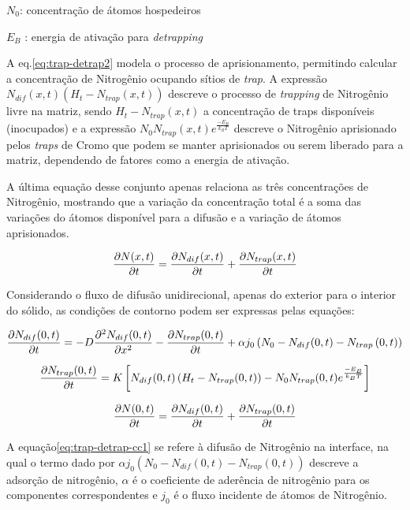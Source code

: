 $N_0$: concentração de átomos hospedeiros
	
$E_B$ : energia de ativação para \textit{detrapping}

A eq.\autoref{eq:trap-detrap2} modela o processo de aprisionamento, permitindo calcular a concentração de Nitrogênio ocupando sítios de \textit{trap}. A expressão $N_{dif}(x,t)\left(H_t-N_{trap}(x,t)\right)$ descreve o processo de \textit{trapping} de Nitrogênio livre na matriz, sendo $H_t - N_{trap}(x,t)$ a concentração de traps disponíveis (inocupados) e a expressão $ N_0 N_{trap}(x,t)e^{\frac{-E_B}{k_BT}}$ descreve o Nitrogênio aprisionado pelos \textit{traps} de Cromo que podem se manter aprisionados ou serem liberado para a matriz, dependendo de fatores como a energia de ativação.

A última equação desse conjunto apenas relaciona as três concentrações de Nitrogênio, mostrando que a variação da concentração total é a soma das variações do átomos disponível para a difusão e a variação de átomos aprisionados. 

\begin{equation}
\label{eq:trap-detrap3}
\pdv{N(x,t)}{t} = \pdv{N_{dif}(x,t)}{t} + \pdv{N_{trap}(x,t)}{t}
\end{equation}

Considerando o fluxo de difusão unidirecional, apenas do exterior para o interior do sólido, as condições de contorno podem ser expressas pelas equações:

\begin{equation}
\label{eq:trap-detrap-cc1}
\pdv{N_{dif}(0,t)}{t} = -D\pdv[2]{N_{dif}(0,t)}{x} - \pdv{N_{trap}(0,t)}{t}  +\alpha j_{0}\left(N_0-N_{dif}(0,t)-N_{trap}\left(0,t\right)\right)
\end{equation}

\begin{equation}
\label{eq:trap-detrap-cc2}
\pdv{N_{trap}(0,t)}{t} = K\left[N_{dif}(0,t)\left(H_t-N_{trap}(0,t)\right) - N_0 N_{trap}(0,t)e^{\frac{-E_B}{k_BT}}\right] 
\end{equation}

\begin{equation}
\label{eq:trap-detrap-cc3}
\pdv{N(0,t)}{t} = \pdv{N_{dif}(0,t)}{t} + \pdv{N_{trap}(0,t)}{t}
\end{equation}

A equação\autoref{eq:trap-detrap-cc1} se refere à difusão de Nitrogênio na interface, na qual o termo dado por $\alpha j_{0}\left(N_0-N_{dif}(0,t)-N_{trap}\left(0,t\right)\right)$ descreve a adsorção de nitrogênio, $\alpha$ é o coeficiente de aderência de nitrogênio para os componentes correspondentes  e  $j_0$ é o fluxo incidente de átomos de Nitrogênio.
